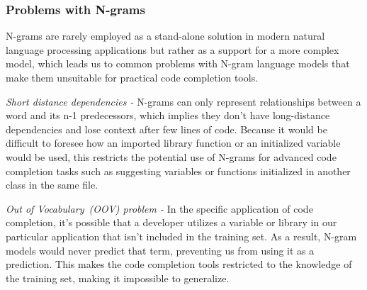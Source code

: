 \subsubsection{Problems with N-grams}
N-grams are rarely employed as a stand-alone solution in modern natural language processing applications but rather as a support for a more complex model, which leads us to common problems with N-gram language models that make them unsuitable for practical code completion tools.

\emph{Short distance dependencies -} N-grams can only represent relationships between a word and its n-1 predecessors, which implies they don't have long-distance dependencies and lose context after few lines of code.
Because it would be difficult to foresee how an imported library function or an initialized variable would be used, this restricts the potential use of N-grams for advanced code completion tasks such as suggesting variables or functions initialized in another class in the same file.

\emph{Out of Vocabulary~(OOV) problem - } In the specific application of code completion, it's possible that a developer utilizes a variable or library in our particular application that isn't included in the training set. 
As a result, N-gram models would never predict that term, preventing us from using it as a prediction. This makes the code completion tools restricted to the knowledge of the training set, making it impossible to generalize.

